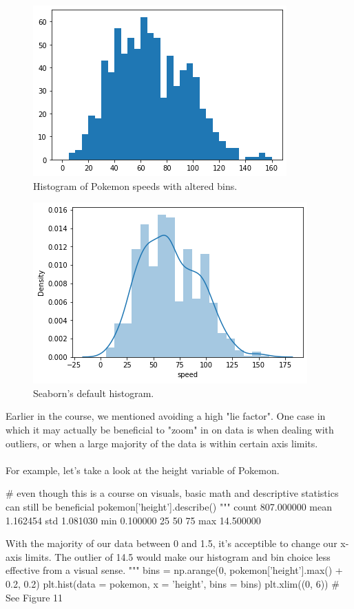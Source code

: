 \begin{figure}
	\includegraphics{images/figure9.png}
	\caption{Histogram of Pokemon speeds with altered bins.}\label{fig:figure9}
\end{figure}

\begin{figure}
	\includegraphics{images/figure10.png}
	\caption{Seaborn's default histogram.}\label{fig:figure10}
\end{figure}

Earlier in the course, we mentioned avoiding a high "lie factor". One case in which it may actually be beneficial to "zoom" in on data is when dealing with outliers, or when a large majority of the data is within certain axis limits.
\\\\

For example, let's take a look at the height variable of Pokemon.

\begin{python}
	# even though this is a course on visuals, basic math and descriptive statistics can still be beneficial
	pokemon['height'].describe()
	"""
	count    807.000000
	mean       1.162454
	std        1.081030
	min        0.100000
	25%
	50%
	75%
	max       14.500000
	
	With the majority of our data between 0 and 1.5, it's acceptible to change our x-axis limits. The outlier of 14.5 would make our histogram and bin choice less effective from a visual sense.
	"""
	bins = np.arange(0, pokemon['height'].max() + 0.2, 0.2)
	plt.hist(data = pokemon, x = 'height', bins = bins)
	plt.xlim((0, 6))
	# See Figure 11
\end{python}

